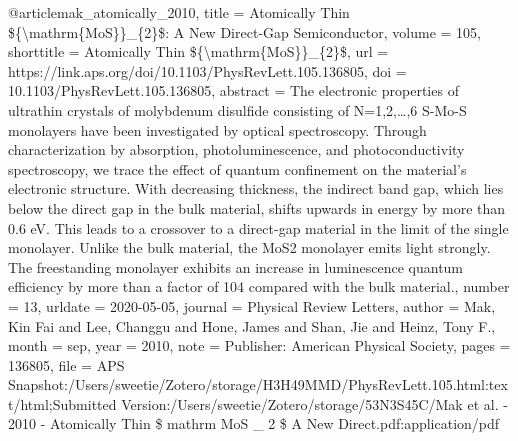 {@article{mak_atomically_2010,
	title = {Atomically {Thin} \$\{{\textbackslash}mathrm\{{MoS}\}\}\_\{2\}\$: {A} {New} {Direct}-{Gap} {Semiconductor}},
	volume = {105},
	shorttitle = {Atomically {Thin} \$\{{\textbackslash}mathrm\{{MoS}\}\}\_\{2\}\$},
	url = {https://link.aps.org/doi/10.1103/PhysRevLett.105.136805},
	doi = {10.1103/PhysRevLett.105.136805},
	abstract = {The electronic properties of ultrathin crystals of molybdenum disulfide consisting of N=1,2,…,6 S-Mo-S monolayers have been investigated by optical spectroscopy. Through characterization by absorption, photoluminescence, and photoconductivity spectroscopy, we trace the effect of quantum confinement on the material’s electronic structure. With decreasing thickness, the indirect band gap, which lies below the direct gap in the bulk material, shifts upwards in energy by more than 0.6 eV. This leads to a crossover to a direct-gap material in the limit of the single monolayer. Unlike the bulk material, the MoS2 monolayer emits light strongly. The freestanding monolayer exhibits an increase in luminescence quantum efficiency by more than a factor of 104 compared with the bulk material.},
	number = {13},
	urldate = {2020-05-05},
	journal = {Physical Review Letters},
	author = {Mak, Kin Fai and Lee, Changgu and Hone, James and Shan, Jie and Heinz, Tony F.},
	month = sep,
	year = {2010},
	note = {Publisher: American Physical Society},
	pages = {136805},
	file = {APS Snapshot:/Users/sweetie/Zotero/storage/H3H49MMD/PhysRevLett.105.html:text/html;Submitted Version:/Users/sweetie/Zotero/storage/53N3S45C/Mak et al. - 2010 - Atomically Thin \$ mathrm MoS _ 2 \$ A New Direct.pdf:application/pdf}
}

}

